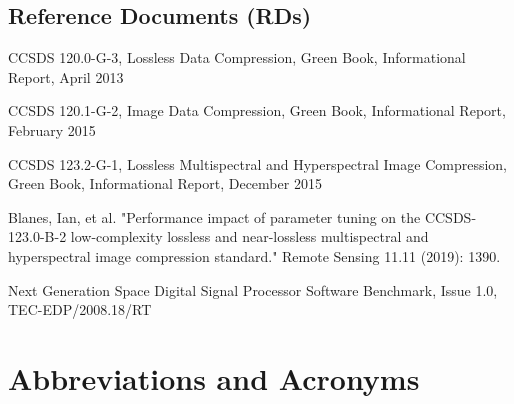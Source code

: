 \documentclass{report}
\def\twodigits#1{%
\ifnum#1<10 0\fi 
\number#1}
\begin{document}
\subsection{Reference Documents (RDs)}

\begin{enumerate}[label={[RD-\protect\twodigits{\theenumi}]}]
    \item \label{rd:ccsds121_greenbook} CCSDS 120.0-G-3, Lossless Data Compression, Green Book, Informational Report, April 2013
    \item \label{rd:ccsds122_greenbook} CCSDS 120.1-G-2, Image Data Compression, Green Book, Informational Report, February 2015
    \item \label{rd:ccsds123_greenbook} CCSDS 123.2-G-1, Lossless Multispectral and Hyperspectral Image Compression, Green Book, Informational Report, December 2015
    \item \label{rd:ccsds123_parameter_tuning} Blanes, Ian, et al. "Performance impact of parameter tuning on the CCSDS-123.0-B-2 low-complexity lossless and near-lossless multispectral and hyperspectral image compression standard." Remote Sensing 11.11 (2019): 1390.
    \item \label{rd:ngdsp} Next Generation Space Digital Signal Processor Software Benchmark, Issue 1.0, TEC-EDP/2008.18/RT
\end{enumerate}

\newpage
\section{Abbreviations and Acronyms}
\end{document}
